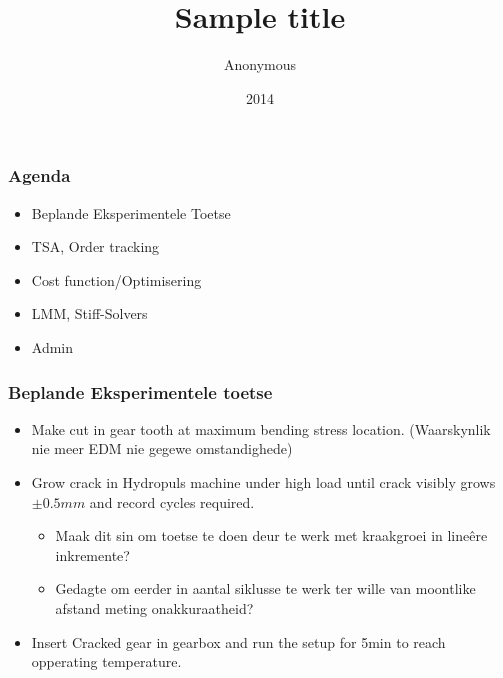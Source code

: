 \documentclass{beamer}
\title{Sample title}
\author{Anonymous}
\institute{Overleaf}
\date{2014}
\begin{document}
\begin{frame}
\frametitle{Agenda}
\begin{itemize}
	\item Beplande Eksperimentele Toetse
	\item TSA, Order tracking
	\item Cost function/Optimisering
	\item LMM, Stiff-Solvers
	\item Admin
\end{itemize}
\end{frame}

\begin{frame}
\frametitle{Beplande Eksperimentele toetse}
\begin{itemize}
	\item Make cut in gear tooth at maximum bending stress location. (Waarskynlik nie meer EDM nie gegewe omstandighede)
	\item Grow crack in Hydropuls machine under high load until crack visibly grows $\pm 0.5mm$ and record cycles required.
	\begin{itemize}
		\item Maak dit sin om toetse te doen deur te werk met kraakgroei in lineêre inkremente? 
		\item Gedagte om eerder in aantal siklusse te werk ter wille van moontlike afstand meting onakkuraatheid?
	\end{itemize}
	\item Insert Cracked gear in gearbox and run the setup for 5min to reach opperating temperature.
	\end{itemize}
\end{frame}
\end{document}
